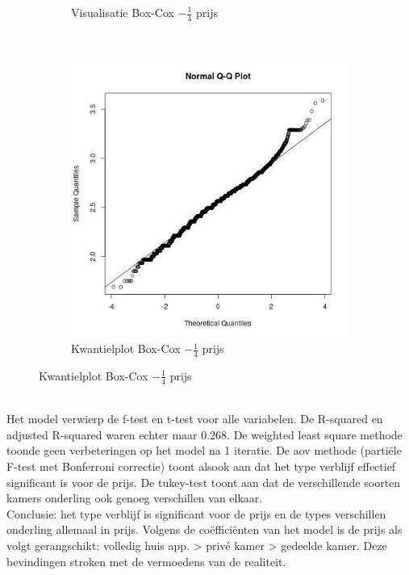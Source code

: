 \documentclass[a4paper,kulak]{kulakarticle} %
\begin{document}
\begin{figure}[H]
\begin{subfigure}[b]{0.23\textwidth}
		\caption{Visualisatie Box-Cox  $-\frac{1}{4}$ prijs}
		\label{fig:bpv}
	\end{subfigure}
	~ %
	\begin{subfigure}[b]{0.23\textwidth}
		\includegraphics[width=\textwidth]{qqbp.jpg}
		\caption{Kwantielplot Box-Cox $-\frac{1}{4}$ prijs}
		\label{fig:qqbp}
	\end{subfigure}
\end{figure}

~\\

Het model verwierp de f-test en t-test voor alle variabelen. 
De R-squared en adjusted R-squared  waren echter maar 0.268.
De weighted least square methode toonde geen verbeteringen op het model na 1 iteratie. 
De aov methode (partiële F-test met Bonferroni correctie) toont alsook aan dat het type verblijf effectief significant is voor de prijs.
De tukey-test toont aan dat de verschillende soorten kamers onderling ook genoeg verschillen van elkaar. \\

Conclusie: het type verblijf is significant voor de prijs en de types verschillen onderling allemaal in prijs. Volgens de coëfficiënten van het model is de prijs als volgt gerangschikt: 
volledig huis app. > privé kamer > gedeelde kamer.
Deze bevindingen stroken met de vermoedens van de realiteit.
\end{document}
